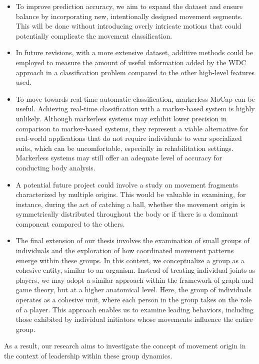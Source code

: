 \begin{itemize}
    \item To improve prediction accuracy, we aim to expand the dataset and ensure balance by incorporating new, intentionally designed movement segments.
        This will be done without introducing overly intricate motions that could potentially complicate the movement classification.
    \item In future revisions, with a more extensive dataset, additive methods could be employed to measure the amount of useful information added by the WDC approach in a classification problem compared to the other high-level features used.
    \item To move towards real-time automatic classification, markerless MoCap can be useful.
        Achieving real-time classification with a marker-based system is highly unlikely.
        Although markerless systems may exhibit lower precision in comparison to marker-based systems, 
        they represent a viable alternative for real-world applications that do not require individuals to wear specialized suits, which can be uncomfortable, especially in rehabilitation settings. 
        Markerless systems may still offer an adequate level of accuracy for conducting body analysis.
    \item A potential future project could involve a study on movement fragments characterized by multiple origins.
        This would be valuable in examining, for instance, during the act of catching a ball, whether the movement origin is symmetrically distributed throughout the body or if there is a dominant component compared to the others.
    \item The final extension of our thesis involves the examination of small groups of individuals and the exploration of how coordinated movement patterns emerge within these groups.
        In this context, we conceptualize a group as a cohesive entity, similar to an organism.
        Instead of treating individual joints as players, we may adopt a similar approach within the framework of graph and game theory, but at a higher anatomical level.
        Here, the group of individuals operates as a cohesive unit, where each person in the group takes on the role of a player. 
        This approach enables us to examine leading behaviors, including those exhibited by individual initiators whose movements influence the entire group.
\end{itemize}

As a result, our research aims to investigate the concept of movement origin in the context of leadership within these group dynamics.